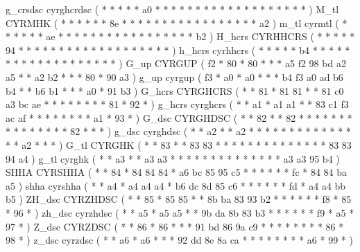 \makecod g_crsdsc     cyrghcrdsc        ( *  *       *  *   *  a0 *  *     *  *  *  *  *     *  *  *  *     *  *  *     *   *  *    *  *   )
\makeCOD M_tl         CYRMHK            ( *  *       *  *   *  *  8e *     *  *  *  *  *     *  *  *  *     *  *  *     *   *  *    *  a2  )
\makecod m_tl         cyrmtl            ( *  *       *  *   *  *  ae *     *  *  *  *  *     *  *  *  *     *  *  *     *   *  *    *  b2  )
\makeCOD H_hcrs       CYRHHCRS          ( *  *       *  *   *  94 *  *     *  *  *  *  *     *  *  *  *     *  *  *     *   *  *    *  *   )
\makecod h_hcrs       cyrhhcrs          ( *  *       *  *   *  b4 *  *     *  *  *  *  *     *  *  *  *     *  *  *     *   *  *    *  *   )
\makeCOD G_up         CYRGUP            ( f2 *       80 *   80 *  *  *     a5 f2 98 bd a2    a5 *  *  a2    b2 *  *     *   80 *    90 a3  )
\makecod g_up         cyrgup            ( f3 *       a0 *   a0 *  *  *     b4 f3 a0 ad b6    b4 *  *  b6    b1 *  *     *   a0 *    91 b3  )
\makeCOD G_hcrs       CYRGHCRS          ( *  *       81 *   81 81 *  *     81 c0 a3 bc ae    *  *  *  *     *  *  *     *   81 *    92 *   )
\makecod g_hcrs       cyrghcrs          ( *  *       a1 *   a1 a1 *  *     83 c1 f3 ac af    *  *  *  *     *  *  *     *   a1 *    93 *   )
\makeCOD G_dsc        CYRGHDSC          ( *  *       82 *   *  82 *  *     *  *  *  *  *     *  *  *  *     *  *  *     *   82 *    *  *   )
\makecod g_dsc        cyrghdsc          ( *  *       a2 *   *  a2 *  *     *  *  *  *  *     *  *  *  *     *  *  *     *   a2 *    *  *   )
\makeCOD G_tl         CYRGHK            ( *  *       83 *   *  83 83 *     *  *  *  *  *     *  *  *  *     *  *  *     *   83 83   94 a4  )
\makecod g_tl         cyrghk            ( *  *       a3 *   *  a3 a3 *     *  *  *  *  *     *  *  *  *     *  *  *     *   a3 a3   95 b4  )
\makeCOD SHHA         CYRSHHA           ( *  *       84 *   84 84 84 *     a6 bc 85 95 c5    *  *  *  *     *  *  fc    *   84 84   ba a5  )
\makecod shha         cyrshha           ( *  *       a4 *   a4 a4 a4 *     b6 dc 8d 85 c6    *  *  *  *     *  *  fd    *   a4 a4   bb b5  )
\makeCOD ZH_dsc       CYRZHDSC          ( *  *       85 *   85 85 *  *     8b ba 83 93 b2    *  *  *  *     *  *  f8    *   85 *    96 *   )
\makecod zh_dsc       cyrzhdsc          ( *  *       a5 *   a5 a5 *  *     9b da 8b 83 b3    *  *  *  *     *  *  f9    *   a5 *    97 *   )
\makeCOD Z_dsc        CYRZDSC           ( *  *       86 *   86 *  *  *     91 bd 86 9a c9    *  *  *  *     *  *  *     *   86 *    98 *   )
\makecod z_dsc        cyrzdsc           ( *  *       a6 *   a6 *  *  *     92 dd 8e 8a ca    *  *  *  *     *  *  *     *   a6 *    99 *   )
